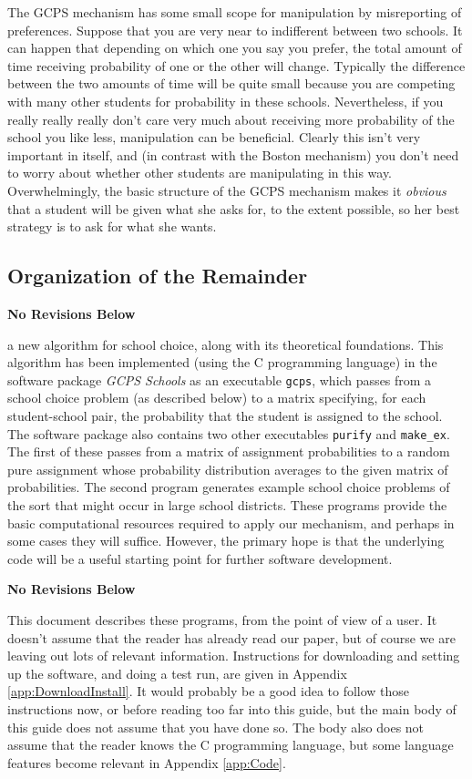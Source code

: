 \documentclass[12pt]{article}
\theoremstyle{definition}
\newcommand{\norev}{\medskip \centerline{\textbf{No Revisions Below}} \medskip}
\begin{document}
The GCPS mechanism has some small scope for manipulation by
misreporting of preferences.  Suppose that you are very near to
indifferent between two schools.  It can happen that depending on
which one you say you prefer, the total amount of time receiving
probability of one or the other will change. Typically the difference
between the two amounts of time will be quite small because you are
competing with many other students for probability in these schools.
Nevertheless, if you really really really don't care very much about
receiving more probability of the school you like less, manipulation
can be beneficial.  Clearly this isn't very important in itself, and
(in contrast with the Boston mechanism) you don't need to worry about
whether other students are manipulating in this way.  Overwhelmingly,
the basic structure of the GCPS mechanism makes it \emph{obvious} that
a student will be given what she asks for, to the extent possible, so
her best strategy is to ask for what she wants.

\subsection{Organization of the Remainder}

\norev

a
new algorithm for school choice, along with its theoretical
foundations.  This algorithm has been implemented (using the C
programming language) in the software package \emph{GCPS Schools} as
an executable \texttt{gcps}, which passes from a school choice problem
(as described below) to a matrix specifying, for each student-school
pair, the probability that the student is assigned to the school.  The
software package also contains two other executables \texttt{purify}
and \texttt{make\_ex}.  The first of these passes from a matrix of
assignment probabilities to a random pure assignment whose probability
distribution averages to the given matrix of probabilities.  The
second program generates example school choice problems of the sort
that might occur in large school districts.  These programs provide
the basic computational resources required to apply our mechanism, and
perhaps in some cases they will suffice.  However, the primary hope is
that the underlying code will be a useful starting point for further
software development.

\norev

This document describes these programs, from the point of view of a
user.  It doesn't assume that the reader has already read our paper,
but of course we are leaving out lots of relevant information.
Instructions for downloading and setting up the software, and doing a
test run, are given in Appendix \ref{app:DownloadInstall}.  It would
probably be a good idea to follow those instructions now, or before
reading too far into this guide, but the main body of this guide does
not assume that you have done so.  The body also does not assume that
the reader knows the C programming language, but some language
features become relevant in Appendix \ref{app:Code}.
\end{document}
